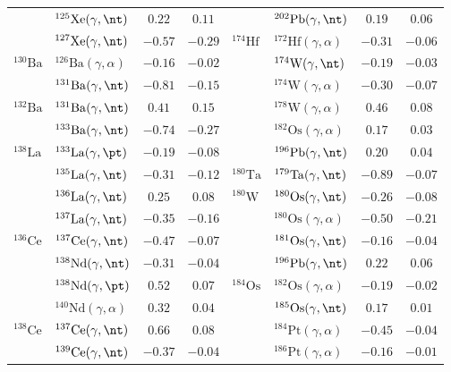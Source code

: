 {\begin{longtable}{llcc llcc}
$ $ & $^{125}\mathrm{Xe}(\gamma,\nt)$ & $0.22$ & $0.11$ & $ $ & $^{202}\mathrm{Pb}(\gamma,\nt)$ & $0.19$ & $0.06$ \\ 
$ $ & $^{127}\mathrm{Xe}(\gamma,\nt)$ & $-0.57$ & $-0.29$ & $^{174}\mathrm{Hf}$ & $^{172}\mathrm{Hf}(\gamma,\alpha)$ & $-0.31$ & $-0.06$ \\ 
$^{130}\mathrm{Ba}$ & $^{126}\mathrm{Ba}(\gamma,\alpha)$ & $-0.16$ & $-0.02$ & $ $ & $^{174}\mathrm{W}(\gamma,\nt)$ & $-0.19$ & $-0.03$ \\ 
$ $ & $^{131}\mathrm{Ba}(\gamma,\nt)$ & $-0.81$ & $-0.15$ & $ $ & $^{174}\mathrm{W}(\gamma,\alpha)$ & $-0.30$ & $-0.07$ \\ 
$^{132}\mathrm{Ba}$ & $^{131}\mathrm{Ba}(\gamma,\nt)$ & $0.41$ & $0.15$ & $ $ & $^{178}\mathrm{W}(\gamma,\alpha)$ & $0.46$ & $0.08$ \\ 
$ $ & $^{133}\mathrm{Ba}(\gamma,\nt)$ & $-0.74$ & $-0.27$ & $ $ & $^{182}\mathrm{Os}(\gamma,\alpha)$ & $0.17$ & $0.03$ \\ 
$^{138}\mathrm{La}$ & $^{133}\mathrm{La}(\gamma,\pt)$ & $-0.19$ & $-0.08$ & $ $ & $^{196}\mathrm{Pb}(\gamma,\nt)$ & $0.20$ & $0.04$ \\ 
$ $ & $^{135}\mathrm{La}(\gamma,\nt)$ & $-0.31$ & $-0.12$ & $^{180}\mathrm{Ta}$ & $^{179}\mathrm{Ta}(\gamma,\nt)$ & $-0.89$ & $-0.07$ \\ 
$ $ & $^{136}\mathrm{La}(\gamma,\nt)$ & $0.25$ & $0.08$ & $^{180}\mathrm{W}$ & $^{180}\mathrm{Os}(\gamma,\nt)$ & $-0.26$ & $-0.08$ \\ 
$ $ & $^{137}\mathrm{La}(\gamma,\nt)$ & $-0.35$ & $-0.16$ & $ $ & $^{180}\mathrm{Os}(\gamma,\alpha)$ & $-0.50$ & $-0.21$ \\ 
$^{136}\mathrm{Ce}$ & $^{137}\mathrm{Ce}(\gamma,\nt)$ & $-0.47$ & $-0.07$ & $ $ & $^{181}\mathrm{Os}(\gamma,\nt)$ & $-0.16$ & $-0.04$ \\ 
$ $ & $^{138}\mathrm{Nd}(\gamma,\nt)$ & $-0.31$ & $-0.04$ & $ $ & $^{196}\mathrm{Pb}(\gamma,\nt)$ & $0.22$ & $0.06$ \\ 
$ $ & $^{138}\mathrm{Nd}(\gamma,\pt)$ & $0.52$ & $0.07$ & $^{184}\mathrm{Os}$ & $^{182}\mathrm{Os}(\gamma,\alpha)$ & $-0.19$ & $-0.02$ \\ 
$ $ & $^{140}\mathrm{Nd}(\gamma,\alpha)$ & $0.32$ & $0.04$ & $ $ & $^{185}\mathrm{Os}(\gamma,\nt)$ & $0.17$ & $0.01$ \\ 
$^{138}\mathrm{Ce}$ & $^{137}\mathrm{Ce}(\gamma,\nt)$ & $0.66$ & $0.08$ & $ $ & $^{184}\mathrm{Pt}(\gamma,\alpha)$ & $-0.45$ & $-0.04$ \\ 
$ $ & $^{139}\mathrm{Ce}(\gamma,\nt)$ & $-0.37$ & $-0.04$ & $ $ & $^{186}\mathrm{Pt}(\gamma,\alpha)$ & $-0.16$ & $-0.01$ \\ 

\end{longtable}}
